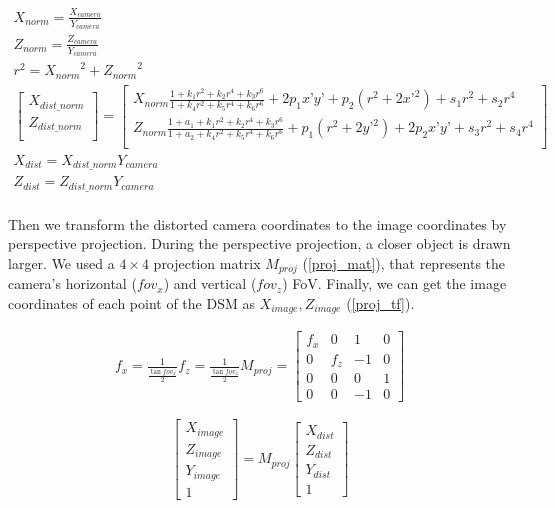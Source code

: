 \documentclass{article}
\begin{document}
\label{dist_model}
\begin{gather}
  X_{norm} = \frac{X_{camera}}{Y_{camera}} \\
  Z_{norm} = \frac{Z_{camera}}{Y_{camera}} \\
  r^2 = {X_{norm}}^2 + {Z_{norm}}^2 \\
  \begin{bmatrix}
    X_{dist\_norm} \\ 
    Z_{dist\_norm} \\
  \end{bmatrix} 
  = 
  \begin{bmatrix} 
    X_{norm} \frac{1 + k_1 r^2 + k_2 r^4 + k_3 r^6}{1 + k_4 r^2 + k_5 r^4 + k_6 r^6} + 2 p_1 x’ y’ + p_2(r^2 + 2 x’^2) + s_1 r^2 + s_2 r^4 \\ 
    Z_{norm} \frac{1 + a_1 + k_1 r^2 + k_2 r^4 + k_3 r^6}{1 + a_2 + k_4 r^2 + k_5 r^4 + k_6 r^6} + p_1 (r^2 + 2 y’^2) + 2 p_2 x’ y’ + s_3 r^2 + s_4 r^4 \\    \end{bmatrix} \\
  X_{dist} = X_{dist\_norm} Y_{camera} \\
  Z_{dist} = Z_{dist\_norm} Y_{camera} \\
\end{gather}

Then we transform the distorted camera coordinates to the image coordinates by perspective projection. During the perspective projection, a closer object is drawn larger. We used a \(4 \times 4\) projection matrix \(M_{proj}\) (\ref{proj_mat}), that represents the camera's horizontal (\(fov_x\)) and vertical (\(fov_z\)) FoV. Finally, we can get the image coordinates of each point of the DSM as \(X_{image}, Z_{image}\) (\ref{proj_tf}).

\label{proj_mat}
\begin{gather}
  f_x = \frac{1}{\frac{\tan fov_x}{2}} 
  f_z = \frac{1}{\frac{\tan fov_z}{2}}
  M_{proj} = 
  \begin{bmatrix} 
    f_x & 0 & 1 & 0\\ 
    0 & f_z & -1 & 0 \\ 
    0 & 0 & 0 & 1\\ 
    0 & 0 & -1 & 0 
  \end{bmatrix}
\end{gather}

\label{proj_tf}
\begin{equation}
  \begin{bmatrix} 
    X_{image} \\ Z_{image} \\ Y_{image} \\ 1 
  \end{bmatrix}
  =
  M_{proj}
  \begin{bmatrix} 
    X_{dist} \\ Z_{dist} \\ Y_{dist} \\ 1 
  \end{bmatrix}
\end{equation}
\end{document}

